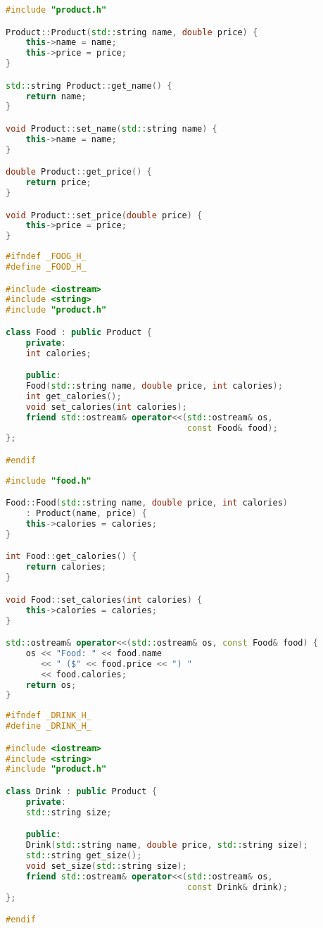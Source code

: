 \begin{lstlisting}[language=C++]
#include "product.h"

Product::Product(std::string name, double price) {
    this->name = name;
    this->price = price;
}

std::string Product::get_name() {
    return name;
}

void Product::set_name(std::string name) {
    this->name = name;
}

double Product::get_price() {
    return price;
}

void Product::set_price(double price) {
    this->price = price;
}
\end{lstlisting}

\begin{lstlisting}[language=C++]
#ifndef _FOOG_H_
#define _FOOD_H_

#include <iostream>
#include <string>
#include "product.h"

class Food : public Product {
    private:
    int calories;

    public:
    Food(std::string name, double price, int calories);
    int get_calories();
    void set_calories(int calories);
    friend std::ostream& operator<<(std::ostream& os,
                                    const Food& food);
};

#endif
\end{lstlisting}

\begin{lstlisting}[language=C++]
#include "food.h"

Food::Food(std::string name, double price, int calories)
    : Product(name, price) {
    this->calories = calories;
}

int Food::get_calories() {
    return calories;
}

void Food::set_calories(int calories) {
    this->calories = calories;
}

std::ostream& operator<<(std::ostream& os, const Food& food) {
    os << "Food: " << food.name
       << " ($" << food.price << ") "
       << food.calories;
    return os;
}
\end{lstlisting}

\begin{lstlisting}[language=C++]
#ifndef _DRINK_H_
#define _DRINK_H_

#include <iostream>
#include <string>
#include "product.h"

class Drink : public Product {
    private:
    std::string size;

    public:
    Drink(std::string name, double price, std::string size);
    std::string get_size();
    void set_size(std::string size);
    friend std::ostream& operator<<(std::ostream& os,
                                    const Drink& drink);
};

#endif
\end{lstlisting}

